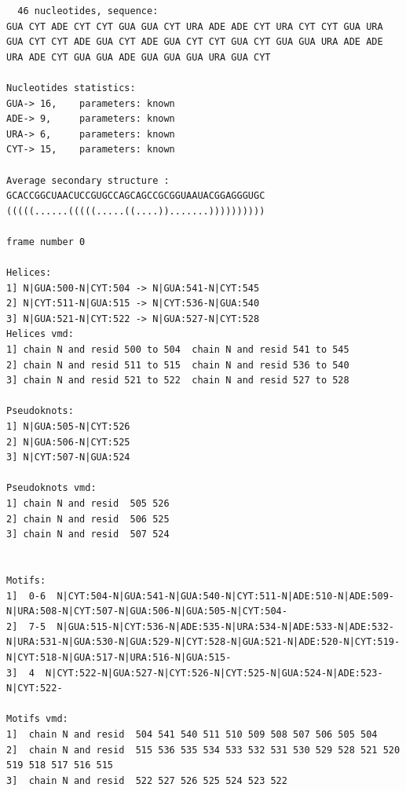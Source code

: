 \documentclass[12pt]{article}
\begin{document}
\begin{appendices}
\begin{scriptsize}
\begin{lstlisting}
  46 nucleotides, sequence: 
GUA CYT ADE CYT CYT GUA GUA CYT URA ADE ADE CYT URA CYT CYT GUA URA GUA CYT CYT ADE GUA CYT ADE GUA CYT CYT GUA CYT GUA GUA URA ADE ADE URA ADE CYT GUA GUA ADE GUA GUA GUA URA GUA CYT 

Nucleotides statistics:
GUA-> 16, 	 parameters: known
ADE-> 9, 	 parameters: known
URA-> 6, 	 parameters: known
CYT-> 15, 	 parameters: known

Average secondary structure :
GCACCGGCUAACUCCGUGCCAGCAGCCGCGGUAAUACGGAGGGUGC
(((((......(((((.....((....)).......))))))))))

frame number 0

Helices: 
1] N|GUA:500-N|CYT:504 -> N|GUA:541-N|CYT:545
2] N|CYT:511-N|GUA:515 -> N|CYT:536-N|GUA:540
3] N|GUA:521-N|CYT:522 -> N|GUA:527-N|CYT:528
Helices vmd:
1] chain N and resid 500 to 504  chain N and resid 541 to 545
2] chain N and resid 511 to 515  chain N and resid 536 to 540
3] chain N and resid 521 to 522  chain N and resid 527 to 528

Pseudoknots:
1] N|GUA:505-N|CYT:526
2] N|GUA:506-N|CYT:525
3] N|CYT:507-N|GUA:524

Pseudoknots vmd:
1] chain N and resid  505 526 
2] chain N and resid  506 525 
3] chain N and resid  507 524 


Motifs:
1]  0-6  N|CYT:504-N|GUA:541-N|GUA:540-N|CYT:511-N|ADE:510-N|ADE:509-N|URA:508-N|CYT:507-N|GUA:506-N|GUA:505-N|CYT:504-
2]  7-5  N|GUA:515-N|CYT:536-N|ADE:535-N|URA:534-N|ADE:533-N|ADE:532-N|URA:531-N|GUA:530-N|GUA:529-N|CYT:528-N|GUA:521-N|ADE:520-N|CYT:519-N|CYT:518-N|GUA:517-N|URA:516-N|GUA:515-
3]  4  N|CYT:522-N|GUA:527-N|CYT:526-N|CYT:525-N|GUA:524-N|ADE:523-N|CYT:522-

Motifs vmd:
1]  chain N and resid  504 541 540 511 510 509 508 507 506 505 504 
2]  chain N and resid  515 536 535 534 533 532 531 530 529 528 521 520 519 518 517 516 515 
3]  chain N and resid  522 527 526 525 524 523 522 



\end{lstlisting}
\end{scriptsize}
\end{appendices}
\end{document}
